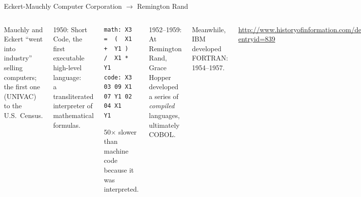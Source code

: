 \documentclass[aspectratio=169]{beamer}
\begin{document}
\begin{frame}[fragile]{Eckert-Mauchly Computer Corporation $\to$ Remington Rand}
\vspace{0.5 cm}

\begin{columns}
Mauchly and Eckert ``went into industry'' selling computers; the first one (UNIVAC) to the U.S.\ Census.

\vspace{0.5 cm}
1950: Short Code, the first executable high-level language: \\ a transliterated interpreter of mathematical formulas.
\begin{center}
\small
\vspace{-0.1 cm}
\begin{minipage}{0.8\linewidth}
\begin{verbatim}
math: X3 =  (  X1 +  Y1 )  /  X1 * Y1
code: X3 03 09 X1 07 Y1 02 04 X1   Y1
\end{verbatim}
\end{minipage}

\vspace{0.2 cm}
\normalsize
50$\times$ slower than machine code because it was interpreted.
\end{center}

\vspace{0.25 cm}
1952--1959: At Remington Rand, Grace Hopper developed a series of {\it compiled} languages, ultimately COBOL.

\vspace{0.25 cm}
Meanwhile, IBM developed FORTRAN: 1954--1957.

\small
\vspace{0.25 cm}
\textcolor{blue}{\url{http://www.historyofinformation.com/detail.php?entryid=839}}

\includegraphics[width=\linewidth]{Univac_I_at_Census_Bureau_with_two_operators.jpg}


\end{columns}
\end{frame}
\end{document}
